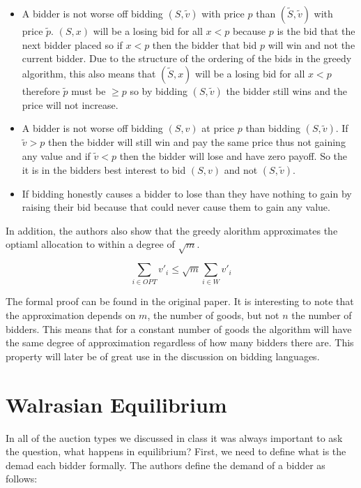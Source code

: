 \documentclass[10pt,onecolumn,letterpaper]{article}
\theoremstyle{definition}
\begin{document}
\begin{itemize}
	\item A bidder is not worse off bidding $(S, \tilde{v})$ with price $p$ than $(\tilde{S}, \tilde{v})$ with price $\tilde{p}$. $(S,x)$ will be a losing bid for all $x < p$ because $p$ is the bid that the next bidder placed so if $x < p$ then the bidder that bid $p$ will win and not the current bidder. Due to the structure of the ordering of the bids in the greedy algorithm, this also means that $(\tilde{S}, x)$ will be a losing bid for all $x < p$ therefore $\tilde{p}$ must be $ \geq p$ so by bidding $(S, \tilde{v})$ the bidder still wins and the price will not increase. 
	
	\item A bidder is not worse off bidding $(S, v)$ at price $p$ than bidding $(S, \tilde{v})$. If $\tilde{v} > p$ then the bidder will still win and pay the same price thus not gaining any value and if $\tilde{v} < p$ then the bidder will lose and have zero payoff. So the it is in the bidders best interest to bid $(S,v)$ and not $(S, \tilde{v})$.

	\item If bidding honestly causes a bidder to lose than they have nothing to gain by raising their bid because that could never cause them to gain any value.
\end{itemize}

In addition, the authors also show that the greedy alorithm approximates the optiaml allocation to within a degree of $\sqrt{m}$.

$$\sum_{i \in OPT} v'_i \leq \sqrt{m} \sum_{i \in W} v'_i $$

The formal proof can be found in the original paper. It is interesting to note that the approximation depends on $m$, the number of goods, but not $n$ the number of bidders. This means that for a constant number of goods the algorithm will have the same degree of approximation regardless of how many bidders there are. This property will later be of great use in the discussion on bidding languages. 

\section{Walrasian Equilibrium} %

In all of the auction types we discussed in class it was always important to ask the question, what happens in equilibrium? First, we need to define what is the demad each bidder formally. The authors define the demand of a bidder as follows:
\end{document}
